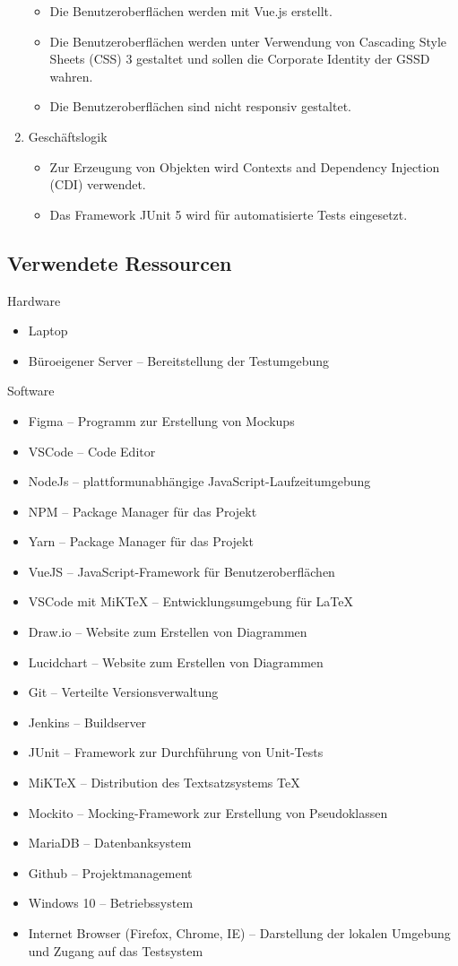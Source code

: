 \begin{enumerate}
\begin{itemize}
\item Die Benutzeroberflächen werden mit Vue.js erstellt.
\item Die Benutzeroberflächen werden unter Verwendung von Cascading Style Sheets (CSS) 3 gestaltet und sollen die Corporate Identity der \acs{GSSD} wahren.
\item Die Benutzeroberflächen sind nicht responsiv gestaltet.
\end{itemize}
\item Geschäftslogik
\begin{itemize}
\item Zur Erzeugung von Objekten wird Contexts and Dependency Injection (CDI) verwendet.
\item Das Framework JUnit 5 wird für automatisierte Tests eingesetzt.
\end{itemize}
\end{enumerate}
\clearpage

\subsection{Verwendete Ressourcen}\label{appendix:a2}\par
 Hardware
\begin{itemize}
	\item Laptop
\item Büroeigener Server – Bereitstellung der Testumgebung
\end{itemize}

Software
\begin{itemize}
\item Figma -- Programm zur Erstellung von Mockups
\item VSCode -- Code Editor
\item NodeJs -- plattformunabhängige JavaScript-Laufzeitumgebung
\item NPM – Package Manager für das Projekt
\item Yarn – Package Manager für das Projekt
\item VueJS -- JavaScript-Framework für Benutzeroberflächen
\item VSCode mit MiKTeX -- Entwicklungsumgebung für \LaTeX
\item Draw.io – Website zum Erstellen von Diagrammen
\item Lucidchart – Website zum Erstellen von Diagrammen
\item Git -- Verteilte Versionsverwaltung
\item Jenkins -- Buildserver
\item JUnit -- Framework zur Durchführung von Unit-Tests
\item MiKTeX -- Distribution des Textsatzsystems \TeX
\item Mockito -- Mocking-Framework zur Erstellung von Pseudoklassen
\item MariaDB -- Datenbanksystem
\item Github -- Projektmanagement
\item Windows 10 -- Betriebssystem
\item Internet Browser (Firefox, Chrome, IE) – Darstellung der lokalen Umgebung und Zugang
auf das Testsystem
\end{itemize}

